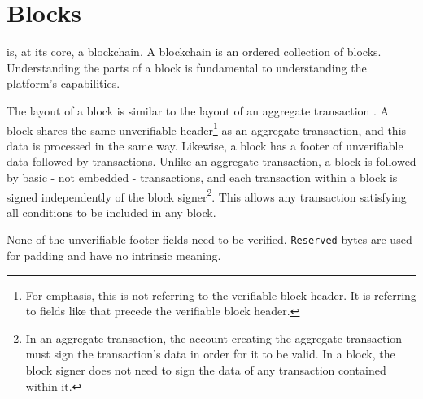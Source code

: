 \section{Blocks}
\label{sec:blocks}


\codenamechapterfirstword is, at its core, a blockchain.
A blockchain is an ordered collection of blocks.
Understanding the parts of a \codenamespace block is fundamental to understanding the platform's capabilities.

The layout of a block is similar to the layout of an aggregate transaction .
A block shares the same unverifiable header\footnote{
	For emphasis, this is not referring to the verifiable block header. It is referring to fields like  that precede the verifiable block header.
} as an aggregate transaction, and this data is processed in the same way.
Likewise, a block has a footer of unverifiable data followed by transactions.
Unlike an aggregate transaction, a block is followed by basic - not embedded - transactions, and each transaction within a block is signed independently of the block signer\footnote{
In an aggregate transaction, the account creating the aggregate transaction must sign the transaction's data in order for it to be valid.
In a block, the block signer does not need to sign the data of any transaction contained within it.
}.
This allows any transaction satisfying all conditions to be included in any block.

None of the unverifiable footer fields need to be verified.
\texttt{Reserved} bytes are used for padding and have no intrinsic meaning.

